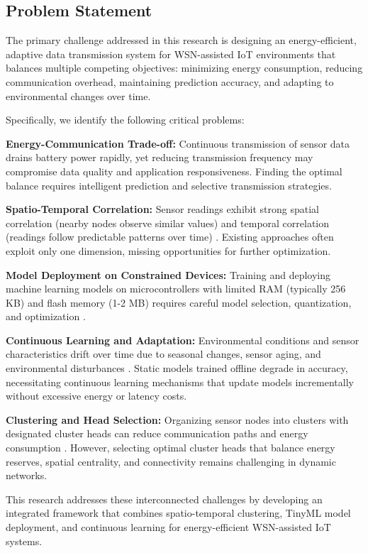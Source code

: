 \documentclass[12pt,a4paper]{article}
\begin{document}
\subsection{Problem Statement}
The primary challenge addressed in this research is designing an energy-efficient, adaptive data transmission system for WSN-assisted IoT environments that balances multiple competing objectives: minimizing energy consumption, reducing communication overhead, maintaining prediction accuracy, and adapting to environmental changes over time.

Specifically, we identify the following critical problems:

\textbf{Energy-Communication Trade-off:} Continuous transmission of sensor data drains battery power rapidly, yet reducing transmission frequency may compromise data quality and application responsiveness. Finding the optimal balance requires intelligent prediction and selective transmission strategies.

\textbf{Spatio-Temporal Correlation:} Sensor readings exhibit strong spatial correlation (nearby nodes observe similar values) and temporal correlation (readings follow predictable patterns over time) \cite{Chen2023SpatioTemporal}. Existing approaches often exploit only one dimension, missing opportunities for further optimization.

\textbf{Model Deployment on Constrained Devices:} Training and deploying machine learning models on microcontrollers with limited RAM (typically 256 KB) and flash memory (1-2 MB) requires careful model selection, quantization, and optimization \cite{Sakr2024TinyMLApplications}.

\textbf{Continuous Learning and Adaptation:} Environmental conditions and sensor characteristics drift over time due to seasonal changes, sensor aging, and environmental disturbances \cite{Alonso2024OnlineLearning, Silva2023IncrementalML}. Static models trained offline degrade in accuracy, necessitating continuous learning mechanisms that update models incrementally without excessive energy or latency costs.

\textbf{Clustering and Head Selection:} Organizing sensor nodes into clusters with designated cluster heads can reduce communication paths and energy consumption \cite{Sharma2024ClusteringWSN, Abbas2023EnergyAwareClustering}. However, selecting optimal cluster heads that balance energy reserves, spatial centrality, and connectivity remains challenging in dynamic networks.

This research addresses these interconnected challenges by developing an integrated framework that combines spatio-temporal clustering, TinyML model deployment, and continuous learning for energy-efficient WSN-assisted IoT systems.
\end{document}
